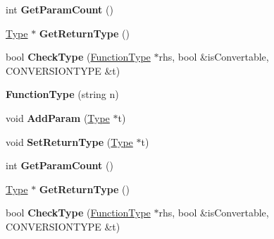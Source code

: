 \begin{DoxyCompactItemize}
\item 
\hypertarget{classFunctionType_a8b6fed7ff4d79b5db3d39cd042326090}{int {\bfseries Get\-Param\-Count} ()}\label{classFunctionType_a8b6fed7ff4d79b5db3d39cd042326090}

\item 
\hypertarget{classFunctionType_a601e763553086c0d7a4c2de97d6de2bc}{\hyperlink{classType}{Type} $\ast$ {\bfseries Get\-Return\-Type} ()}\label{classFunctionType_a601e763553086c0d7a4c2de97d6de2bc}

\item 
\hypertarget{classFunctionType_a150840d05c02a26ca776aad22e0deed1}{bool {\bfseries Check\-Type} (\hyperlink{classFunctionType}{Function\-Type} $\ast$rhs, bool \&is\-Convertable, C\-O\-N\-V\-E\-R\-S\-I\-O\-N\-T\-Y\-P\-E \&t)}\label{classFunctionType_a150840d05c02a26ca776aad22e0deed1}

\item 
\hypertarget{classFunctionType_a924981ea6fc18a7a9ed4cb5c94a136d6}{{\bfseries Function\-Type} (string n)}\label{classFunctionType_a924981ea6fc18a7a9ed4cb5c94a136d6}

\item 
\hypertarget{classFunctionType_a9259c94250b6cb903c6013bc10a0b7bc}{void {\bfseries Add\-Param} (\hyperlink{classType}{Type} $\ast$t)}\label{classFunctionType_a9259c94250b6cb903c6013bc10a0b7bc}

\item 
\hypertarget{classFunctionType_a1462775c5732b70b07c689ab7088814d}{void {\bfseries Set\-Return\-Type} (\hyperlink{classType}{Type} $\ast$t)}\label{classFunctionType_a1462775c5732b70b07c689ab7088814d}

\item 
\hypertarget{classFunctionType_a8b6fed7ff4d79b5db3d39cd042326090}{int {\bfseries Get\-Param\-Count} ()}\label{classFunctionType_a8b6fed7ff4d79b5db3d39cd042326090}

\item 
\hypertarget{classFunctionType_a601e763553086c0d7a4c2de97d6de2bc}{\hyperlink{classType}{Type} $\ast$ {\bfseries Get\-Return\-Type} ()}\label{classFunctionType_a601e763553086c0d7a4c2de97d6de2bc}

\item 
\hypertarget{classFunctionType_a150840d05c02a26ca776aad22e0deed1}{bool {\bfseries Check\-Type} (\hyperlink{classFunctionType}{Function\-Type} $\ast$rhs, bool \&is\-Convertable, C\-O\-N\-V\-E\-R\-S\-I\-O\-N\-T\-Y\-P\-E \&t)}\label{classFunctionType_a150840d05c02a26ca776aad22e0deed1}


\end{DoxyCompactItemize}
